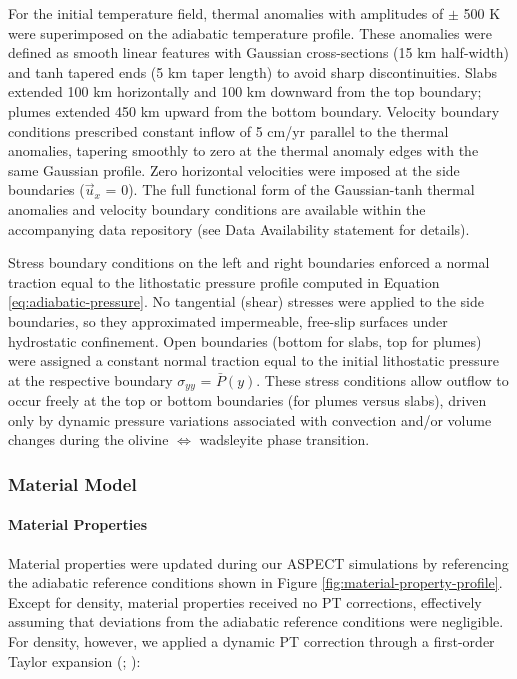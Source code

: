 \documentclass[
  paper=a4,
  ,captions=tableheading
]{scrartcl}
\begin{document}
For the initial temperature field, thermal anomalies with amplitudes of
\(\pm\) 500 K were superimposed on the adiabatic temperature profile.
These anomalies were defined as smooth linear features with Gaussian
cross-sections (15 km half-width) and tanh tapered ends (5 km taper
length) to avoid sharp discontinuities. Slabs extended 100 km
horizontally and 100 km downward from the top boundary; plumes extended
450 km upward from the bottom boundary. Velocity boundary conditions
prescribed constant inflow of 5 cm/yr parallel to the thermal anomalies,
tapering smoothly to zero at the thermal anomaly edges with the same
Gaussian profile. Zero horizontal velocities were imposed at the side
boundaries (\(\vec{u}_x\) = 0). The full functional form of the
Gaussian-tanh thermal anomalies and velocity boundary conditions are
available within the accompanying data repository (see Data Availability
statement for details).

Stress boundary conditions on the left and right boundaries enforced a
normal traction equal to the lithostatic pressure profile computed in
Equation \ref{eq:adiabatic-pressure}. No tangential (shear) stresses
were applied to the side boundaries, so they approximated impermeable,
free-slip surfaces under hydrostatic confinement. Open boundaries
(bottom for slabs, top for plumes) were assigned a constant normal
traction equal to the initial lithostatic pressure at the respective
boundary \(\sigma_{yy}\) = \(\bar{P}(y)\). These stress conditions allow
outflow to occur freely at the top or bottom boundaries (for plumes
versus slabs), driven only by dynamic pressure variations associated
with convection and/or volume changes during the olivine
\(\Leftrightarrow\) wadsleyite phase transition.

\subsubsection{Material Model}\label{sec:material-model}

\paragraph{Material Properties}\label{sec:material-properties}

Material properties were updated during our ASPECT simulations by
referencing the adiabatic reference conditions shown in Figure
\ref{fig:material-property-profile}. Except for density, material
properties received no PT corrections, effectively assuming that
deviations from the adiabatic reference conditions were negligible. For
density, however, we applied a dynamic PT correction through a
first-order Taylor expansion (; ):
\end{document}
